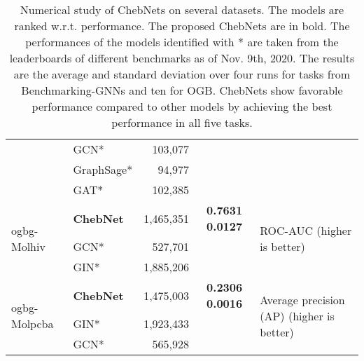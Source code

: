 \documentclass[letterpaper]{article} \usepackage{aaai21}  \usepackage{times}  \usepackage{helvet} \usepackage{courier}  \usepackage[hyphens]{url}  \usepackage{graphicx} \usepackage{natbib}  \usepackage{caption} \frenchspacing  \setlength{\pdfpagewidth}{8.5in}  \setlength{\pdfpageheight}{11in}
\begin{document}
\begin{table*}[ht!]
\begin{tabular}{@{}llrcl@{}}
                             & GCN*       & 103,077       &                              &                                                       \\
                             & GraphSage* & 94,977        &                              &                                                       \\
                             & GAT*       & 102,385        &                             &                                                       \\ \midrule
\multirow{3}{*}{ogbg-Molhiv} & \textbf{ChebNet}   & 1,465,351    & \textbf{0.7631  0.0127} & \multirow{3}{*}{ROC-AUC (higher is better)}           \\
                             & GCN*       & 527,701       &                            &                                                       \\
                             & GIN*       & 1,885,206     &                           &                                                       \\ \midrule
\multirow{3}{*}{ogbg-Molpcba} & \textbf{ChebNet} & 1,475,003 & \textbf{0.2306  0.0016} & \multirow{3}{*}{Average precision (AP) (higher is better)} \\
                             & GIN*       & 1,923,433     &                            &                                                       \\
                             & GCN*       & 565,928       &                            &                                                       \\
                             \bottomrule
\end{tabular}
\caption{Numerical study of ChebNets on several datasets. The models are ranked w.r.t. performance. The proposed ChebNets are in bold. The performances of the models identified with * are taken from the leaderboards of different benchmarks as of Nov. 9th, 2020. The results are the average and standard deviation over four runs for tasks from Benchmarking-GNNs and ten for OGB. ChebNets show favorable performance compared to other models by achieving the best performance in all five tasks.}
\label{table:summary}
\end{table*}
\end{document}
